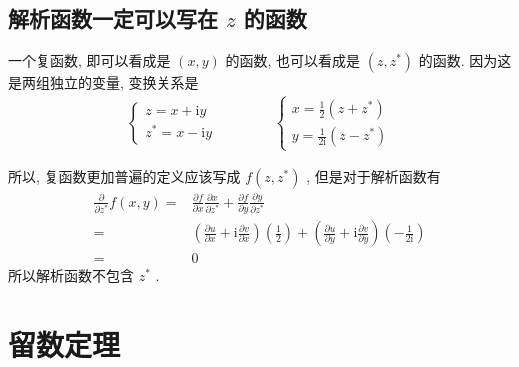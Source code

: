 \documentclass{ctexart}
\begin{document}
\subsection{解析函数一定可以写在 $z$ 的函数}

一个复函数, 即可以看成是 $(x,y)$ 的函数, 也可以看成是 $(z,z^{*})$ 的函数.
因为这是两组独立的变量, 变换关系是
\begin{align*}
  \left\{
  \begin{array}{c}
    z = x + \mathrm{i} y \\
    z^{*} = x - \mathrm{i}y
      \end{array}
  \right.
  \quad  \quad  \quad  \quad
    \left\{
  \begin{array}{c}
    x = \frac{1}{2}(z + z^{* }) \\
    y = \frac{1}{2\mathrm{i}} (z - z^{*})
          \end{array}
  \right.
\end{align*}

所以, 复函数更加普遍的定义应该写成 $f(z,z^{* })$ , 但是对于解析函数有
\begin{align*}
  \frac{\partial}{\partial z^{* }}f(x, y) =& \frac{\partial f}{\partial x}\frac{\partial x}{\partial z^{* }}
               +\frac{\partial f}{\partial y}\frac{\partial y}{\partial z^{* }} \\
        =& \left(\frac{\partial u}{\partial x} + \mathrm{i}\frac{\partial v}{\partial x}\right)\left(\frac{1}{2}\right)
               + \left(\frac{\partial u}{\partial y} +\mathrm{i}\frac{\partial v}{\partial y}\right)\left(-\frac{1}{2\mathrm{i}}\right) \\
          =&0
\end{align*}
所以解析函数不包含 $z^{* }$ .


\section{留数定理}
\end{document}
